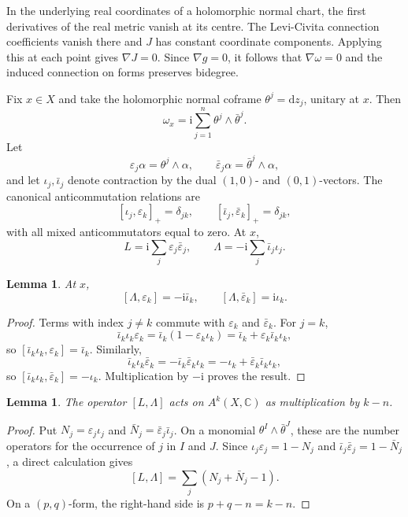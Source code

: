 \documentclass[11pt,reqno]{amsart}
\newtheorem{lemma}[theorem]{Lemma}
\theoremstyle{definition}
\theoremstyle{remark}
\newcommand{\C}{\mathbb{C}}
\newcommand{\dd}{\mathrm{d}}
\newcommand{\ii}{\mathrm{i}}
\begin{document}
In the underlying real coordinates of a holomorphic normal chart, the first
derivatives of the real metric vanish at its centre. The Levi-Civita
connection coefficients vanish there and $J$ has constant coordinate
components. Applying this at each point gives $\nabla J=0$. Since $\nabla g=0$,
it follows that $\nabla\omega=0$ and the induced connection on forms
preserves bidegree.

Fix $x\in X$ and take the holomorphic normal coframe $\theta^j=\dd z_j$,
unitary at $x$. Then
\[
\omega_x=\ii\sum_{j=1}^n\theta^j\wedge\bar\theta^j.
\]
Let
\[
\varepsilon_j\alpha=\theta^j\wedge\alpha,
\qquad
\bar\varepsilon_j\alpha=\bar\theta^j\wedge\alpha,
\]
and let $\iota_j,\bar\iota_j$ denote contraction by the dual $(1,0)$- and
$(0,1)$-vectors. The canonical anticommutation relations are
\[
[\iota_j,\varepsilon_k]_+=\delta_{jk},
\qquad
[\bar\iota_j,\bar\varepsilon_k]_+=\delta_{jk},
\]
with all mixed anticommutators equal to zero. At $x$,
\[
L=\ii\sum_j\varepsilon_j\bar\varepsilon_j,
\qquad
\Lambda=-\ii\sum_j\bar\iota_j\iota_j.
\]

\begin{lemma}
\label{lem:lambda-eps}
At $x$,
\[
[\Lambda,\varepsilon_k]=-\ii\bar\iota_k,
\qquad
[\Lambda,\bar\varepsilon_k]=\ii\iota_k.
\]
\end{lemma}

\begin{proof}
Terms with index $j\neq k$ commute with $\varepsilon_k$ and
$\bar\varepsilon_k$. For $j=k$,
\[
\bar\iota_k\iota_k\varepsilon_k
=\bar\iota_k(1-\varepsilon_k\iota_k)
=\bar\iota_k+\varepsilon_k\bar\iota_k\iota_k,
\]
so $[\bar\iota_k\iota_k,\varepsilon_k]=\bar\iota_k$. Similarly,
\[
\bar\iota_k\iota_k\bar\varepsilon_k
=-\bar\iota_k\bar\varepsilon_k\iota_k
=-\iota_k+\bar\varepsilon_k\bar\iota_k\iota_k,
\]
so $[\bar\iota_k\iota_k,\bar\varepsilon_k]=-\iota_k$. Multiplication by
$-\ii$ proves the result.
\end{proof}

\begin{lemma}
\label{lem:L-Lambda}
The operator $[L,\Lambda]$ acts on $A^k(X,\C)$ as multiplication by $k-n$.
\end{lemma}

\begin{proof}
Put $N_j=\varepsilon_j\iota_j$ and
$\bar N_j=\bar\varepsilon_j\bar\iota_j$. On a monomial
$\theta^I\wedge\bar\theta^J$, these are the number operators for the occurrence
of $j$ in $I$ and $J$. Since
$\iota_j\varepsilon_j=1-N_j$ and
$\bar\iota_j\bar\varepsilon_j=1-\bar N_j$, a direct calculation gives
\[
[L,\Lambda]
=\sum_j\left(N_j+\bar N_j-1\right).
\]
On a $(p,q)$-form, the right-hand side is $p+q-n=k-n$.
\end{proof}
\end{document}
